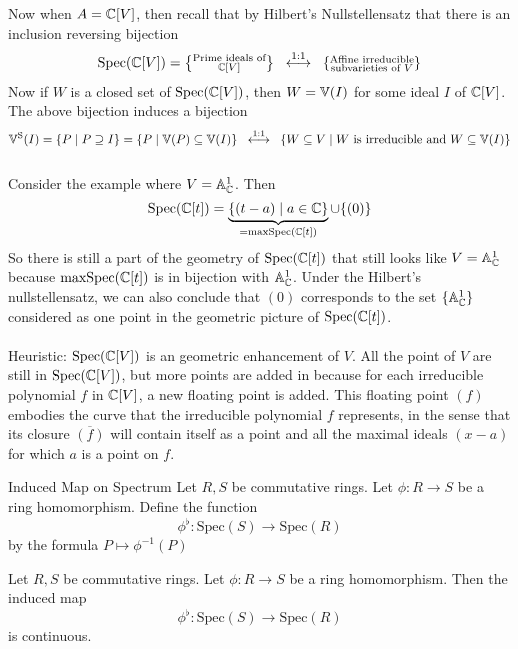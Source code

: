 \documentclass[a4paper]{article}
\begin{document}
Now when $A=\mathbb{C}[V]$, then recall that by Hilbert's Nullstellensatz that there is an inclusion reversing bijection $$\text{Spec}(\mathbb{C}[V])=\left\{\substack{\text{Prime ideals of}\\ \mathbb{C}[V]}\right\}\;\;\overset{\text{1:1}}{\longleftrightarrow}\;\;\left\{\substack{\text{Affine irreducible}\\\text{subvarieties of } V}\right\}$$ Now if $W$ is a closed set of $\text{Spec}(\mathbb{C}[V])$, then $W=\mathbb{V}(I)$ for some ideal $I$ of $\mathbb{C}[V]$. The above bijection induces a bijection $$\mathbb{V}^\text{S}(I)=\left\{P\;|\;P\supseteq I\right\}=\left\{P\;|\;\mathbb{V}(P)\subseteq\mathbb{V}(I)\right\}\;\;\overset{\text{1:1}}{\longleftrightarrow}\;\;\left\{W\subseteq V\;|\;W\text{ is irreducible and }W\subseteq\mathbb{V}(I)\right\}$$~\\

Consider the example where $V=\mathbb{A}_{\mathbb{C}}^1$. Then $$\text{Spec}(\mathbb{C}[t])=\underbrace{\{(t-a)\;|\;a\in\mathbb{C}\}}_{=\text{maxSpec}(\mathbb{C}[t])}\cup\{(0)\}$$ So there is still a part of the geometry of $\text{Spec}(\mathbb{C}[t])$ that still looks like $V=\mathbb{A}_{\mathbb{C}}^1$ because $\text{maxSpec}(\mathbb{C}[t])$ is in bijection with $\mathbb{A}_{\mathbb{C}}^1$. Under the Hilbert's nullstellensatz, we can also conclude that $(0)$ corresponds to the set $\{\mathbb{A}_{\mathbb{C}}^1\}$ considered as one point in the geometric picture of $\text{Spec}(\mathbb{C}[t])$. \\~\\

Heuristic: $\text{Spec}(\mathbb{C}[V])$ is an geometric enhancement of $V$. All the point of $V$ are still in $\text{Spec}(\mathbb{C}[V])$, but more points are added in because for each irreducible polynomial $f$ in $\mathbb{C}[V]$, a new floating point is added. This floating point $(f)$ embodies the curve that the irreducible polynomial $f$ represents, in the sense that its closure $\overline{(f)}$ will contain itself as a point and all the maximal ideals $(x-a)$ for which $a$ is a point on $f$. 

\begin{defn}{Induced Map on Spectrum}{} Let $R,S$ be commutative rings. Let $\phi:R\to S$ be a ring homomorphism. Define the function $$\phi^\flat:\text{Spec}(S)\to\text{Spec}(R)$$ by the formula $P\mapsto\phi^{-1}(P)$
\end{defn}

\begin{lmm}{}{}  Let $R,S$ be commutative rings. Let $\phi:R\to S$ be a ring homomorphism.  Then the induced map $$\phi^\flat:\text{Spec}(S)\to\text{Spec}(R)$$ is continuous. 
\end{lmm}
\end{document}
